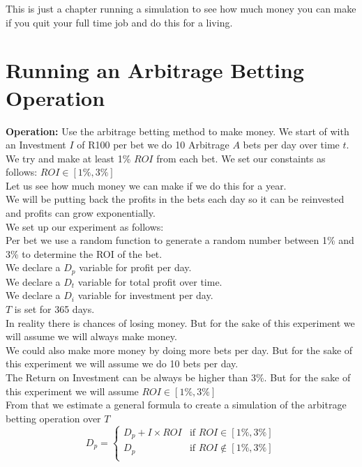 This is just a chapter running a simulation to see how much money you can make if you quit your full time job and do this for a living.

\section{Running an Arbitrage Betting Operation}

\textbf{Operation:} Use the arbitrage betting method to make money. We start of with an Investment $I$ of R100 per bet we do 10 Arbitrage $A$ bets per day over time $t$. We try and make at least 1\% $ROI$ from each bet. We set our constaints as follows:
$ROI \in [1\% , 3\%]$ \\

Let us see how much money we can make if we do this for a year.\\

We will be putting back the profits in the bets each day so it can be reinvested and profits can grow exponentially.\\

We set up our experiment as follows: \\
    Per bet we use a random function to generate a random number between 1\% and 3\% to determine the ROI of the bet.\\
    We declare a $D_{p}$ variable for profit per day.\\
    We declare a $D_{t}$ variable for total profit over time.\\
    We declare a $D_{i}$ variable for investment per day.\\
    $T$ is set for 365 days.\\

    In reality there is chances of losing money. But for the sake of this experiment we will assume we will always make money.\\
    We could also make more money by doing more bets per day. But for the sake of this experiment we will assume we do 10 bets per day.\\
    The Return on Investment can be always be higher than 3\%. But for the sake of this experiment we will assume $ROI \in [1\% , 3\%]$ \\
    From that we estimate a general formula to create a simulation of the arbitrage betting operation over $T$\\

\begin{equation}
    D_{p} = \begin{cases}
        D_{p} + I \times ROI & \text{if } ROI \in [1\% , 3\%] \\
        D_{p} & \text{if } ROI \notin [1\% , 3\%] \\
    \end{cases}
\end{equation}

